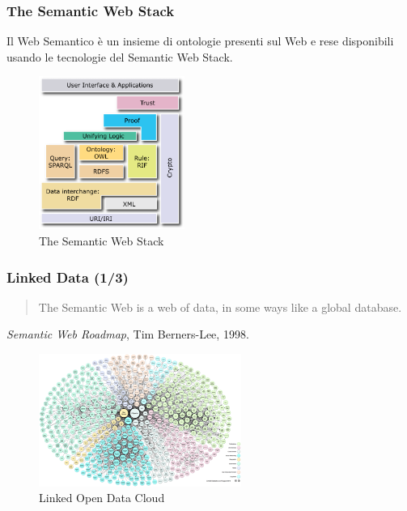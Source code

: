 \documentclass[8pt]{beamer}
\begin{document}
\begin{frame}
\frametitle{The Semantic Web Stack}
Il Web Semantico \`e un insieme di ontologie presenti sul Web
e rese disponibili usando le tecnologie del Semantic Web Stack.
 
\begin{figure}
    \includegraphics[width=180px]{Semantic_Web_Stack.png}
    \caption{The Semantic Web Stack} 
\end{figure}

\end{frame}
\begin{frame}
\frametitle{Linked Data (1/3)}
\begin{quote}
The Semantic Web is a web of data, in some ways like a global database.
\end{quote}
\small{\emph{Semantic Web Roadmap}, Tim Berners-Lee, 1998.}
\begin{figure}
    \includegraphics[width=250px]{lod-cloud_colored_1000px.png} 
    \caption{Linked Open Data Cloud}
\end{figure}
\end{frame}
\end{document}
